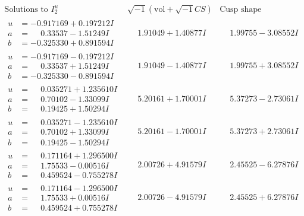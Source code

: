 \documentclass[1p]{elsarticle_modified}
\theoremstyle{definition}
\newcommand{\I}{\sqrt{-1}}
\begin{document}
$$\begin{array}{c|c|c}  
\text{Solutions to }I^u_{2}& \I (\text{vol} + \sqrt{-1}CS) & \text{Cusp shape}\\
 \hline 
\begin{aligned}
u &= -0.917169 + 0.197212 I \\
a &= \phantom{-}0.33537 - 1.51249 I \\
b &= -0.325330 + 0.891594 I\end{aligned}
 & \phantom{-}1.91049 + 1.40877 I & \phantom{-}1.99755 - 3.08552 I \\ \hline\begin{aligned}
u &= -0.917169 - 0.197212 I \\
a &= \phantom{-}0.33537 + 1.51249 I \\
b &= -0.325330 - 0.891594 I\end{aligned}
 & \phantom{-}1.91049 - 1.40877 I & \phantom{-}1.99755 + 3.08552 I \\ \hline\begin{aligned}
u &= \phantom{-}0.035271 + 1.235610 I \\
a &= \phantom{-}0.70102 - 1.33099 I \\
b &= \phantom{-}0.19425 + 1.50294 I\end{aligned}
 & \phantom{-}5.20161 + 1.70001 I & \phantom{-}5.37273 - 2.73061 I \\ \hline\begin{aligned}
u &= \phantom{-}0.035271 - 1.235610 I \\
a &= \phantom{-}0.70102 + 1.33099 I \\
b &= \phantom{-}0.19425 - 1.50294 I\end{aligned}
 & \phantom{-}5.20161 - 1.70001 I & \phantom{-}5.37273 + 2.73061 I \\ \hline\begin{aligned}
u &= \phantom{-}0.171164 + 1.296500 I \\
a &= \phantom{-}1.75533 - 0.00516 I \\
b &= \phantom{-}0.459524 - 0.755278 I\end{aligned}
 & \phantom{-}2.00726 + 4.91579 I & \phantom{-}2.45525 - 6.27876 I \\ \hline\begin{aligned}
u &= \phantom{-}0.171164 - 1.296500 I \\
a &= \phantom{-}1.75533 + 0.00516 I \\
b &= \phantom{-}0.459524 + 0.755278 I\end{aligned}
 & \phantom{-}2.00726 - 4.91579 I & \phantom{-}2.45525 + 6.27876 I \\ \hline\begin{aligned}

\end{aligned}
\end{array}$$
\end{document}
